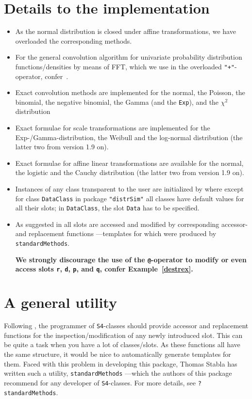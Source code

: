 \documentclass[11pt]{article}
\newcommand{\code}[1]{{\tt #1}}
\newcommand{\pkg}[1]{{\tt "#1"}}
\begin{document}
\section{Details to the implementation}
\begin{itemize}
\item As the normal distribution is closed under affine transformations, we have 
overloaded the corresponding methods. 
\item For the general convolution algorithm for univariate probability 
distribution functions/densities by means of FFT, which we use in the 
overloaded {\tt "+"}-operator, confer~\cite{K:R:S:04}.
\item Exact convolution methods are implemented for the normal, the Poisson, 
the binomial, the negative binomial, the Gamma (and the \code{Exp}), and 
the {$\chi^2$} distribution
\item Exact formulae for scale transformations are implemented for 
the Exp-/Gamma-distribution, the Weibull and the log-normal distribution
(the latter two from version 1.9 on). 
\item Exact formulae for affine linear transformations are available for
the normal, the logistic and the Cauchy distribution (the latter two from
version 1.9 on).  
\item Instances of any class transparent to the user are initialized 
by
where except for class \code{DataClass} in package \pkg{distrSim} all classes 
have default values for all their slots; in \code{DataClass},
the slot \code{Data} has to be specified.
\item
As suggested in \cite{OOPGent} all slots are accessed and modified by 
corresponding accessor- and replacement functions ---templates for which were 
produced by \code{standardMethods}.

{\bf We strongly discourage the use of the \code{@}-operator to modify
or even access slots \code{r}, \code{d}, \code{p}, and \code{q}, confer
Example~{\ref{destrex}}.}
\end{itemize}
%
\section{A general utility}
%
Following \cite{OOPGent}, the programmer of {\tt S4}-classes should provide
accessor and replacement functions for the inspection/modification of
any newly introduced slot. This can be quite a task when you have a 
lot of classes/slots.
As these functions all have the same structure, it would be nice
to automatically generate templates for them.
Faced with this problem in developing this package, Thomas Stabla
has written such a utility, \code{standardMethods} ---which the authors
of this package recommend for any developer of {\tt S4}-classes.
For more details, see \code{?standardMethods}.
\end{document}

